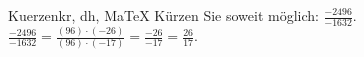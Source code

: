 \begin{MAufgabe}{Kuerzen}{kr, dh, MaTeX}
K\"urzen Sie soweit m\"oglich: $\frac{-2496}{-1632}$.\\ 
\ifLsg\MLoesung
\quad $\frac{-2496}{-1632}=\frac{(96)\cdot(-26)}{(96)\cdot(-17)}=\frac{-26}{-17}=\frac{26}{17}$.\else\relax\fi
 \end{MAufgabe}